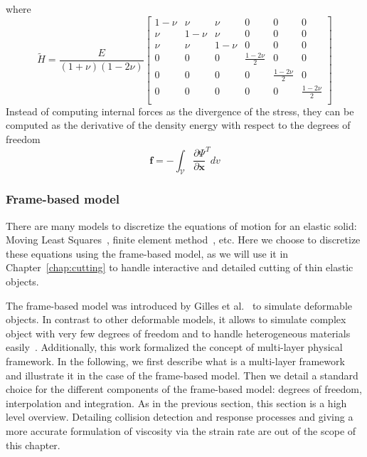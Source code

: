 where
\begin{equation}
\tilde{H} =
\frac{E}{\left(1+\nu\right)\left(1-2\nu\right)}
\begin{bmatrix}
1-\nu & \nu & \nu & 0 & 0 & 0 \\ 
\nu & 1-\nu & \nu & 0 & 0 & 0 \\
\nu & \nu & 1-\nu & 0 & 0 & 0 \\
0 & 0 & 0 & \frac{1-2\nu}{2} & 0 & 0 \\
0 & 0 & 0 & 0 & \frac{1-2\nu}{2} & 0 \\
0 & 0 & 0 & 0 & 0 & \frac{1-2\nu}{2} \\
\end{bmatrix}
\end{equation}
Instead of computing internal forces as the divergence of the stress, they can be computed as the derivative of the density energy with respect to the degrees of freedom
\begin{equation}
\label{eq:internalForces_solids}
\mathbf{f} = -\int_{\mathcal{V}} \frac{\partial \Psi}{\partial \mathbf{x}}^{T} dv
\end{equation}

\subsubsection{Frame-based model}
\label{subsubsec:framebased}
There are many models to discretize the equations of motion for an elastic solid: Moving Least Squares~\cite{Muller2004:melting}, finite element method~\cite{OBrien1999}, etc.
Here we choose to discretize these equations using the frame-based model, as we will use it in Chapter~\ref{chap:cutting} to handle interactive and detailed cutting of thin elastic objects.

The frame-based model was introduced by Gilles et al.~\cite{Gilles2011} to simulate deformable objects. 
In contrast to other deformable models, it allows to simulate complex object with very few degrees of freedom and to handle heterogeneous materials easily~\cite{Faure2011}. 
Additionally, this work formalized the concept of multi-layer physical framework. 
In the following, we first describe what is a multi-layer framework and illustrate it in the case of the frame-based model. 
Then we detail a standard choice for the different components of the frame-based model: degrees of freedom, interpolation and integration. 
As in the previous section, this section is a high level overview. 
Detailing collision detection and response processes and giving a more accurate formulation of viscosity via the strain rate are out of the scope of this chapter.

